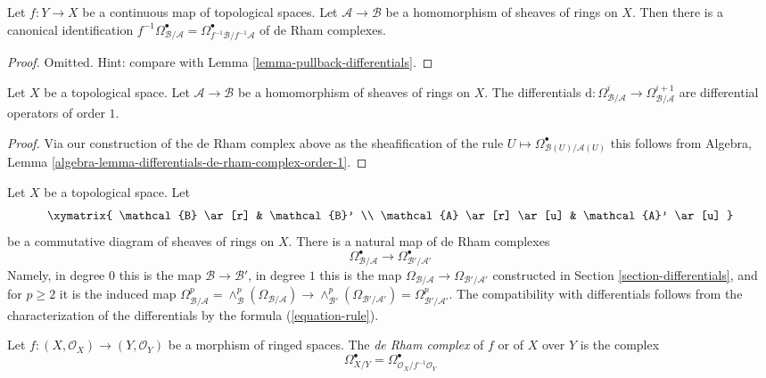 \begin{lemma}
\label{lemma-pullback-de-rham-complex}
Let $f : Y \to X$ be a continuous map of topological spaces.
Let $\mathcal{A} \to \mathcal{B}$
be a homomorphism of sheaves of rings on $X$.
Then there is a canonical identification
$f^{-1}\Omega^\bullet_{\mathcal{B}/\mathcal{A}} =
\Omega^\bullet_{f^{-1}\mathcal{B}/f^{-1}\mathcal{A}}$
of de Rham complexes.
\end{lemma}

\begin{proof}
Omitted. Hint: compare with Lemma \ref{lemma-pullback-differentials}.
\end{proof}

\begin{lemma}
\label{lemma-differentials-de-rham-complex-order-1}
Let $X$ be a topological space. Let $\mathcal{A} \to \mathcal{B}$
be a homomorphism of sheaves of rings on $X$. The differentials
$\text{d} : \Omega^i_{\mathcal{B}/\mathcal{A}}  \to
\Omega^{i + 1}_{\mathcal{B}/\mathcal{A}}$
are differential operators of order $1$.
\end{lemma}

\begin{proof}
Via our construction of the de Rham complex above as the sheafification
of the rule  $U \mapsto \Omega^\bullet_{\mathcal{B}(U)/\mathcal{A}(U)}$
this follows from
Algebra, Lemma \ref{algebra-lemma-differentials-de-rham-complex-order-1}.
\end{proof}

\noindent
Let $X$ be a topological space. Let
$$
\xymatrix{
\mathcal{B} \ar[r] & \mathcal{B}' \\
\mathcal{A} \ar[r] \ar[u] & \mathcal{A}' \ar[u]
}
$$
be a commutative diagram of sheaves of rings on $X$.
There is a natural map of de Rham complexes
$$
\Omega^\bullet_{\mathcal{B}/\mathcal{A}} \longrightarrow
\Omega^\bullet_{\mathcal{B}'/\mathcal{A}'}
$$
Namely, in degree $0$ this is the map $\mathcal{B} \to \mathcal{B}'$,
in degree $1$ this is the map
$\Omega_{\mathcal{B}/\mathcal{A}} \to \Omega_{\mathcal{B}'/\mathcal{A}'}$
constructed in Section \ref{section-differentials}, and for $p \geq 2$
it is the induced map
$\Omega^p_{\mathcal{B}/\mathcal{A}} =
\wedge^p_\mathcal{B}(\Omega_{\mathcal{B}/\mathcal{A}}) \to
\wedge^p_{\mathcal{B}'}(\Omega_{\mathcal{B}'/\mathcal{A}'}) =
\Omega^p_{\mathcal{B}'/\mathcal{A}'}$.
The compatibility with differentials follows from the characterization
of the differentials by the formula (\ref{equation-rule}).

\begin{definition}
\label{definition-de-rham-complex-morphism-ringed-spaces}
Let $f : (X, \mathcal{O}_X) \to (Y, \mathcal{O}_Y)$ be a morphism
of ringed spaces. The {\it de Rham complex} of $f$ or of $X$ over $Y$
is the complex
$$
\Omega^\bullet_{X/Y} = \Omega^\bullet_{\mathcal{O}_X/f^{-1}\mathcal{O}_Y}
$$
\end{definition}

